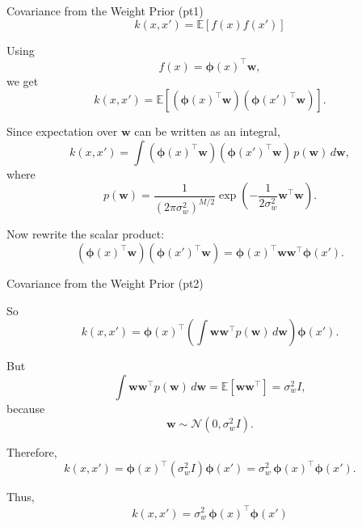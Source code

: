 \documentclass[9pt]{beamer}
\begin{document}
\begin{frame}{Covariance from the Weight Prior (pt1)}
\[
k(x,x') = \mathbb{E}[f(x)f(x')]
\]

Using
\[
f(x)=\boldsymbol{\phi}(x)^\top \mathbf{w},
\]
we get
\[
k(x,x')
= \mathbb{E}\!\left[(\boldsymbol{\phi}(x)^\top \mathbf{w})
(\boldsymbol{\phi}(x')^\top \mathbf{w})\right].
\]

Since expectation over $\mathbf{w}$ can be written as an integral,
\[
k(x,x')
=
\int
(\boldsymbol{\phi}(x)^\top \mathbf{w})
(\boldsymbol{\phi}(x')^\top \mathbf{w})
\, p(\mathbf{w})\, d\mathbf{w},
\]
where
\[
p(\mathbf{w})
=
\frac{1}{(2\pi \sigma_w^2)^{M/2}}
\exp\!\left(-\frac{1}{2\sigma_w^2}\mathbf{w}^\top \mathbf{w}\right).
\]

Now rewrite the scalar product:
\[
(\boldsymbol{\phi}(x)^\top \mathbf{w})
(\boldsymbol{\phi}(x')^\top \mathbf{w})
=
\boldsymbol{\phi}(x)^\top \mathbf{w}\mathbf{w}^\top \boldsymbol{\phi}(x').
\]

\end{frame}
\begin{frame}{Covariance from the Weight Prior (pt2)}

So
\[
k(x,x')
=
\boldsymbol{\phi}(x)^\top
\left(
\int \mathbf{w}\mathbf{w}^\top p(\mathbf{w})\, d\mathbf{w}
\right)
\boldsymbol{\phi}(x').
\]

But
\[
\int \mathbf{w}\mathbf{w}^\top p(\mathbf{w})\, d\mathbf{w}
=
\mathbb{E}[\mathbf{w}\mathbf{w}^\top]
=
\sigma_w^2 I,
\]
because
\[
\mathbf{w}\sim \mathcal N(0,\sigma_w^2 I).
\]

Therefore,
\[
k(x,x')
=
\boldsymbol{\phi}(x)^\top (\sigma_w^2 I)\boldsymbol{\phi}(x')
=
\sigma_w^2\, \boldsymbol{\phi}(x)^\top \boldsymbol{\phi}(x').
\]

Thus,
\[
\boxed{
k(x,x')=\sigma_w^2\, \boldsymbol{\phi}(x)^\top \boldsymbol{\phi}(x')
}
\]
\end{frame}
\end{document}
